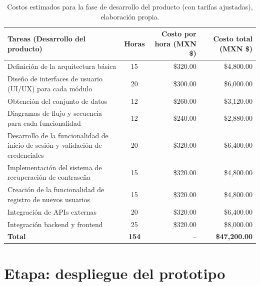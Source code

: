 \begin{table}[H]
	\centering
	\renewcommand{\arraystretch}{1.6}
	\setlength{\tabcolsep}{10pt}
	\Huge
	\begin{adjustbox}{max width=\textwidth}
		\begin{tabular}{|p{9.5cm}|c|r|r|}
			\hline
			\textbf{Tareas (Desarrollo del producto)} & \textbf{Horas} & \textbf{Costo por hora (MXN \$)} & \textbf{Costo total (MXN \$)} \\ \hline
			Definición de la arquitectura básica & 15 & \$320.00 & \$4,800.00 \\ \hline
			Diseño de interfaces de usuario (UI/UX) para cada módulo & 20 & \$300.00 & \$6,000.00 \\ \hline
			Obtención del conjunto de datos & 12 & \$260.00 & \$3,120.00 \\ \hline
			Diagramas de flujo y secuencia para cada funcionalidad & 12 & \$240.00 & \$2,880.00 \\ \hline
			Desarrollo de la funcionalidad de inicio de sesión y validación de credenciales & 20 & \$320.00 & \$6,400.00 \\ \hline
			Implementación del sistema de recuperación de contraseña & 15 & \$320.00 & \$4,800.00 \\ \hline
			Creación de la funcionalidad de registro de nuevos usuarios & 15 & \$320.00 & \$4,800.00 \\ \hline
			Integración de APIs externas & 20 & \$320.00 & \$6,400.00 \\ \hline
			Integración backend y frontend & 25 & \$320.00 & \$8,000.00 \\ \hline
			\textbf{Total} & \textbf{154} & -- & \textbf{\$47,200.00} \\ \hline
		\end{tabular}
	\end{adjustbox}
	\caption[Costos estimados para la fase de desarrollo del producto (con tarifas ajustadas)]{Costos estimados para la fase de desarrollo del producto (con tarifas ajustadas), elaboración propia.} 
	\label{tab:costos_desarrollo_actualizado}
\end{table}


\section{Etapa: despliegue del prototipo}

